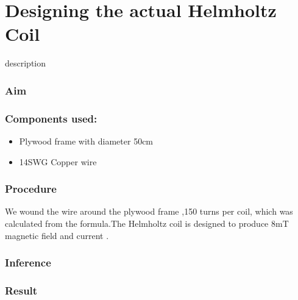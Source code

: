 \chapter{Designing the actual Helmholtz Coil}


description



\subsection{Aim}

\subsection{Components used:}

\vspace{10pt}
\begin{itemize}

  \item Plywood frame with diameter 50cm
  \item 14SWG Copper wire
  
\end{itemize}



\subsection{Procedure}
We wound the wire around the plywood frame ,150 turns per coil, which was calculated from the formula.The Helmholtz coil is designed to produce 8mT magnetic field and   current .


\subsection{Inference}

\subsection{Result}
